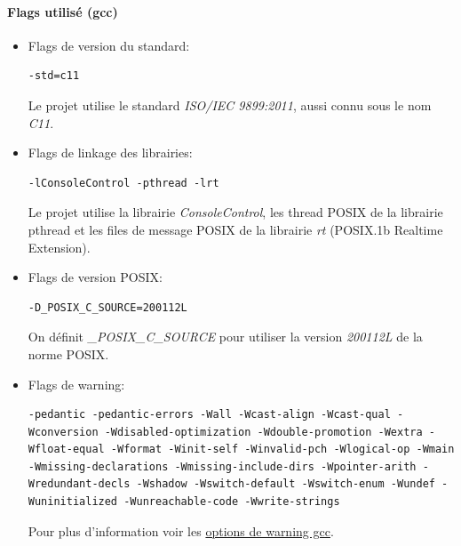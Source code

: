 \documentclass[article, backcover, french, nodocumentinfo]{upmethodology-document}
\begin{document}
				\paragraph*{Flags utilisé (gcc)}
					\begin{itemize}
						\item Flags de version du standard:
							\begin{lstlisting}[breaklines=true,breakatwhitespace=true,breakindent=0pt,columns=fixed,keepspaces=true,frame=single,basicstyle=\footnotesize\sffamily]
-std=c11\end{lstlisting}
							Le projet utilise le standard \textit{ISO/IEC 9899:2011}, aussi connu sous le nom \textit{C11}.
						\item Flags de linkage des librairies:
							\begin{lstlisting}[breaklines=true,breakatwhitespace=true,breakindent=0pt,columns=fixed,keepspaces=true,frame=single,basicstyle=\footnotesize\sffamily]
-lConsoleControl -pthread -lrt\end{lstlisting}
							Le projet utilise la librairie \textit{ConsoleControl}, les thread POSIX de la librairie pthread et les files de message POSIX de la librairie \textit{rt} (POSIX.1b Realtime Extension).
						\item Flags de version POSIX:
							\begin{lstlisting}[breaklines=true,breakatwhitespace=true,breakindent=0pt,columns=fixed,keepspaces=true,frame=single,basicstyle=\footnotesize\sffamily]
-D_POSIX_C_SOURCE=200112L\end{lstlisting}
							On définit \textit{\_POSIX\_C\_SOURCE} pour utiliser la version \textit{200112L} de la norme POSIX.
						\item Flags de warning:
							\begin{lstlisting}[breaklines=true,breakatwhitespace=true,breakindent=0pt,columns=fixed,keepspaces=true,frame=single,basicstyle=\footnotesize\sffamily]
-pedantic -pedantic-errors -Wall -Wcast-align -Wcast-qual -Wconversion -Wdisabled-optimization -Wdouble-promotion -Wextra -Wfloat-equal -Wformat -Winit-self -Winvalid-pch -Wlogical-op -Wmain -Wmissing-declarations -Wmissing-include-dirs -Wpointer-arith -Wredundant-decls -Wshadow -Wswitch-default -Wswitch-enum -Wundef -Wuninitialized -Wunreachable-code -Wwrite-strings\end{lstlisting}
							Pour plus d'information voir les \href{https://gcc.gnu.org/onlinedocs/gcc/Warning-Options.html}{options de warning gcc}.
					\end{itemize}
\end{document}
